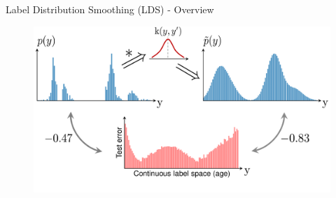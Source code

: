 \begin{frame}{Label Distribution Smoothing (LDS) - Overview}
	\begin{figure}[h]
		\includegraphics[width=\linewidth]{images/err_motivate_sep.pdf}
	\end{figure}
\end{frame}